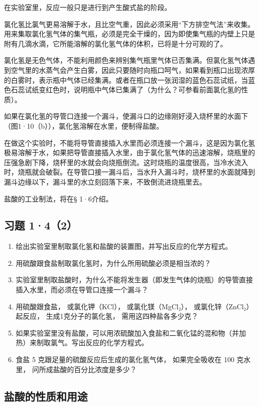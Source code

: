 在实验室里，反应一般只是进行到产生酸式盐的阶段。

氯化氢比氯气更易溶解于水，且比空气重，因此必须采用``下方排空气法''来收集。用来集取氯化氢气体的集气瓶，必须是完全干燥的，因为即使集气瓶的内壁上只是附有几滴水滴，它所能溶解的氯化氢气体的体积，已将是十分可观的了。

氯化氢是无色气体，不能利用颜色来辨别集气瓶里气体已否集满。但氯化氢气体遇到空气里的水蒸气会产生白雾，因此只要随时向瓶口呵气，如果看到瓶口出现浓厚的白雾时，表示瓶中气体已经集满。或者在瓶口放一张润湿的蓝色石蕊试纸，当蓝色石蕊试纸变红色时，说明瓶中气体已集满了（为什么？可参看前面氯化氢的性质）。

如果在氯化氢的导管口连接一个漏斗，使漏斗口的边缘刚好浸入烧杯里的水面下（图1·10（b）），氯化氢溶解在水里，便制得盐酸。

在做这个实验时，不能将导管直接插入水里而必须连接一个漏斗，这是因为氯化氢极易溶解于水，如果把导管直接插入水里，由于氯化氢气体的迅速溶解，烧瓶里的压强急剧下降，烧杯里的水就会向烧瓶倒流。这时烧瓶的温度很高，当冷水流入时，烧瓶就会破裂。在导管口接一漏斗后，当水升入漏斗时，烧杯里的水面就降到漏斗边缘以下，漏斗里的水立刻回落下来，不致倒流进烧瓶里去。

盐酸的工业制法，将在§ 1·6介绍。

\subsection{习题 1·4（2）}

\begin{enumerate}
\item
  绘出实验室里制取氯化氢和盐酸的装置图，并写出反应的化学方程式。
\item
  用硫酸跟食盐制取氯化氢时，为什么所用硫酸必须是相当浓的？
\item
  实验室里制取盐酸时，为什么不能将发生器（即发生气体的烧瓶）的导管直接插入水里，而必须在导管口连接一个漏斗？
\item
  用硫酸跟食盐， 或氯化钾（KCl）， 或氯化镁（MgCl₂）， 或氯化锌（ZnCl₂）
  起反应， 生成1克分子的氯化氢， 需用这四种盐各多少克？
\item
  如果实验室里没有盐酸，可以用浓硫酸加入食盐和二氧化锰的混和物（并加热）来制取氯气。写出反应的化学方程式。
\item
  食盐 5 克跟足量的硫酸反应后生成的氯化氢气体， 如果完全吸收在 100
  克水里， 问所成盐酸的百分比浓度是多少？
\end{enumerate}

\subsection{盐酸的性质和用途}

